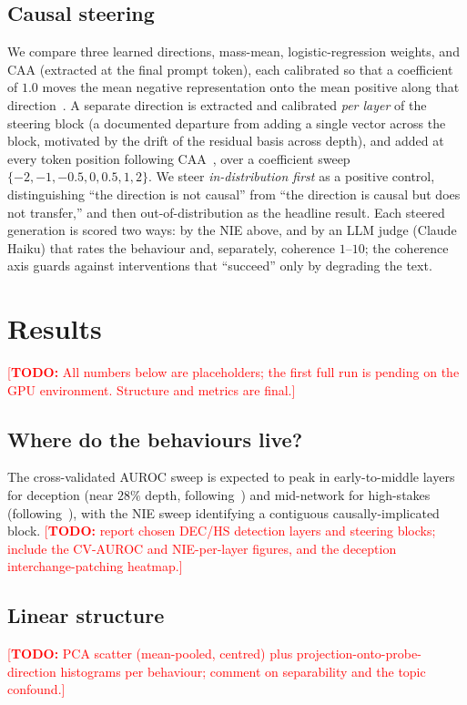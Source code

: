 \documentclass[conference]{IEEEtran}
\newcommand{\TODO}[1]{\textcolor{red}{[\textbf{TODO:} #1]}}
\begin{document}
\subsection{Causal steering}
We compare three learned directions, mass-mean, logistic-regression weights,
and CAA (extracted at the final prompt token), each calibrated so that a
coefficient of $1.0$ moves the mean negative representation onto the mean
positive along that direction~\cite{marks2024}. A separate direction is
extracted and calibrated \emph{per layer} of the steering block (a documented
departure from adding a single vector across the block, motivated by the drift
of the residual basis across depth), and added at every token position
following CAA~\cite{rimsky2024}, over a coefficient sweep
$\{-2,-1,-0.5,0,0.5,1,2\}$. We steer \emph{in-distribution first} as a positive
control, distinguishing ``the direction is not causal'' from ``the direction is
causal but does not transfer,'' and then out-of-distribution as the headline
result. Each steered generation is scored two ways: by the NIE above, and by an
LLM judge (Claude Haiku) that rates the behaviour and, separately, coherence
$1$--$10$; the coherence axis guards against interventions that ``succeed'' only
by degrading the text.

\section{Results}
\TODO{All numbers below are placeholders; the first full run is pending on the
GPU environment. Structure and metrics are final.}

\subsection{Where do the behaviours live?}
The cross-validated AUROC sweep is expected to peak in early-to-middle layers
for deception (near $28\%$ depth, following~\cite{goldowsky2025}) and
mid-network for high-stakes (following~\cite{mckenzie2025}), with the NIE sweep
identifying a contiguous causally-implicated block.
\TODO{report chosen DEC/HS detection layers and steering blocks; include the
CV-AUROC and NIE-per-layer figures, and the deception interchange-patching
heatmap.}

\subsection{Linear structure}
\TODO{PCA scatter (mean-pooled, centred) plus projection-onto-probe-direction
histograms per behaviour; comment on separability and the topic confound.}
\end{document}
